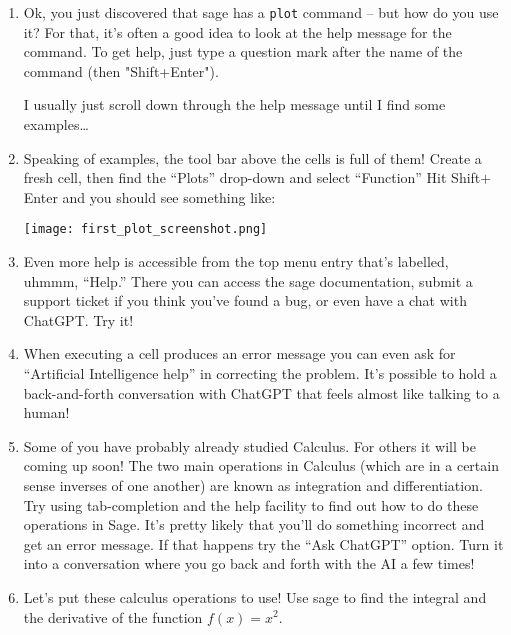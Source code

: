 \begin{enumerate}
\item Ok, you just discovered that sage has a \verb+plot+ command -- but how do you use it? For that, it's often a good idea to look at the help message for the command. To get help, just type a question mark after the name of the command (then "Shift+Enter").

\noindent I usually just scroll down through the help message until I find some examples\dots

\item Speaking of examples, the tool bar above the cells is full of them!  Create a fresh cell, then find the ``Plots'' drop-down and select ``Function''  Hit Shift$+$Enter and you should see something like:

\texttt{[image: first\_plot\_screenshot.png]}

\item Even more help is accessible from the top menu entry that's labelled, uhmmm, ``Help.''  There you can access the sage documentation, submit a support ticket if you think you've found a bug, or even have a chat with ChatGPT.  Try it!

\item When executing a cell produces an error message you can even ask for ``Artificial Intelligence help'' in correcting the problem.  It's possible to hold a back-and-forth conversation with ChatGPT that feels almost like talking to a human!

\item Some of you have probably already studied Calculus.  For others it will be coming up soon! The two main operations in Calculus (which are in a certain sense inverses of one another) are known as integration and differentiation.  Try using tab-completion and the help facility to find out how to do these operations in Sage.  It's pretty likely that you'll do something incorrect and get an error message.  If that happens try the ``Ask ChatGPT'' option.  Turn it into a conversation where you go back and forth with the AI a few times!

\item Let's put these calculus operations to use!  Use sage to find the integral and the derivative of the function $f(x) = x^2.$
\end{enumerate}
